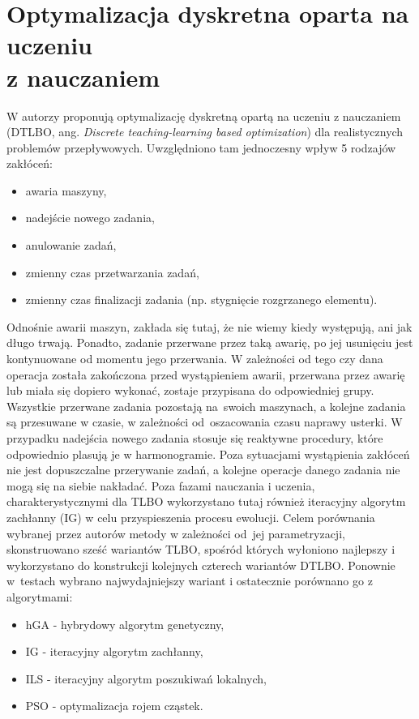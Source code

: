 \documentclass[archivemode]{mgr}
\begin{document}
\section[Optymalizacja dyskretna oparta na uczeniu z nauczaniem]{Optymalizacja dyskretna oparta na uczeniu\\ z nauczaniem}
W \cite{DTLBO} autorzy proponują optymalizację dyskretną opartą na uczeniu z nauczaniem (\mbox{DTLBO}, ang. \emph{Discrete teaching-learning based optimization}) dla realistycznych problemów przepływowych. Uwzględniono tam jednoczesny wpływ 5 rodzajów zakłóceń:
\begin{itemize}
    \item awaria maszyny,
    \item nadejście nowego zadania,
    \item anulowanie zadań,
    \item zmienny czas przetwarzania zadań,
    \item zmienny czas finalizacji zadania (np. stygnięcie rozgrzanego elementu).
\end{itemize}
Odnośnie awarii maszyn, zakłada się tutaj, że nie wiemy kiedy występują, ani jak długo trwają. Ponadto, zadanie przerwane przez taką awarię, po jej usunięciu jest kontynuowane od momentu jego przerwania. W zależności od tego czy dana operacja została zakończona przed wystąpieniem awarii, przerwana przez awarię lub miała się dopiero wykonać, zostaje przypisana do odpowiedniej grupy. Wszystkie przerwane zadania pozostają na~swoich maszynach, a  kolejne zadania są przesuwane w czasie, w zależności od~oszacowania czasu naprawy usterki. W przypadku nadejścia nowego zadania stosuje się reaktywne procedury, które odpowiednio plasują je w harmonogramie. Poza sytuacjami wystąpienia zakłóceń nie jest dopuszczalne przerywanie zadań, a kolejne operacje danego zadania nie mogą się na siebie nakładać. Poza fazami nauczania i uczenia, charakterystycznymi dla TLBO wykorzystano tutaj również iteracyjny algorytm zachłanny (IG) w celu przyspieszenia procesu ewolucji. Celem porównania wybranej przez autorów metody w zależności od~jej parametryzacji, skonstruowano sześć wariantów TLBO, spośród których wyłoniono najlepszy i wykorzystano do konstrukcji kolejnych czterech wariantów DTLBO. Ponownie w~testach wybrano najwydajniejszy wariant i ostatecznie porównano go z algorytmami:
\begin{itemize}
    \item hGA - hybrydowy algorytm genetyczny,
    \item IG - iteracyjny algorytm zachłanny,
    \item ILS - iteracyjny algorytm poszukiwań lokalnych,
    \item PSO - optymalizacja rojem cząstek.
\end{itemize}
\end{document}
